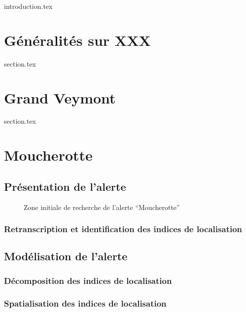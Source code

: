 
\chaptertoc{}

{introduction.tex}

\section{Généralités sur XXX}
\label{sec:9-1}
{section.tex}

\section{Grand Veymont}
\label{sec:9-2}
{section.tex}

\section{Moucherotte}
\label{sec:9-2}

\subsection{Présentation de l'alerte}
\label{subsec:9-2-1}


\begin{figure}
  \centering
  
  \caption{Zone initiale de recherche de l'alerte
    \enquote{Moucherotte}}
  \label{fig:zir_moucherotte}
\end{figure}

\subsubsection{Retranscription et identification des indices de localisation}
\label{subsec:9-2-1-1}

\subsection{Modélisation de l'alerte}
\label{subsec:9-2-2}

\subsubsection{Décomposition des indices de localisation}
\label{subsec:9-2-2-2}

\subsubsection{Spatialisation des indices de localisation}
\label{subsec:9-2-2-3}

